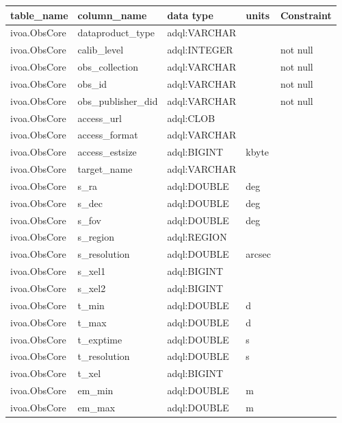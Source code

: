 \documentclass[11pt,a4paper]{ivoa}
\begin{document}
\begin{tabularx}{\textwidth}{|p{}|p{}|p{}|p{}|p{}|}
\hline
table\_name & column\_name & data type & units & Constraint\\\hline
ivoa.ObsCore & dataproduct\_type & adql:VARCHAR &  & \\\hline
ivoa.ObsCore & calib\_level & adql:INTEGER & & not null\\\hline
ivoa.ObsCore & obs\_collection & adql:VARCHAR & & not null\\\hline
ivoa.ObsCore & obs\_id & adql:VARCHAR & & not null\\\hline
ivoa.ObsCore & obs\_publisher\_did & adql:VARCHAR & & not null\\\hline
ivoa.ObsCore & access\_url & adql:CLOB & & \\\hline
ivoa.ObsCore & access\_format & adql:VARCHAR & & \\\hline
ivoa.ObsCore & access\_estsize & adql:BIGINT & kbyte & \\\hline
ivoa.ObsCore & target\_name & adql:VARCHAR & & \\\hline
ivoa.ObsCore & s\_ra & adql:DOUBLE & deg & \\\hline
ivoa.ObsCore & s\_dec & adql:DOUBLE & deg  & \\\hline
ivoa.ObsCore & s\_fov & adql:DOUBLE & deg  & \\\hline
ivoa.ObsCore & s\_region & adql:REGION &  & \\\hline
ivoa.ObsCore & s\_resolution & adql:DOUBLE & arcsec  & \\\hline
ivoa.ObsCore & s\_xel1 & adql:BIGINT &  & \\\hline
ivoa.ObsCore & s\_xel2 & adql:BIGINT &  & \\\hline
ivoa.ObsCore & t\_min & adql:DOUBLE & d  & \\\hline
ivoa.ObsCore & t\_max & adql:DOUBLE & d  & \\\hline
ivoa.ObsCore & t\_exptime & adql:DOUBLE & s  & \\\hline
ivoa.ObsCore & t\_resolution & adql:DOUBLE & s  & \\\hline
ivoa.ObsCore & t\_xel & adql:BIGINT &  & \\\hline
ivoa.ObsCore & em\_min & adql:DOUBLE & m & \\\hline
ivoa.ObsCore & em\_max & adql:DOUBLE & m & \\\hline

\end{tabularx}
\end{document}
